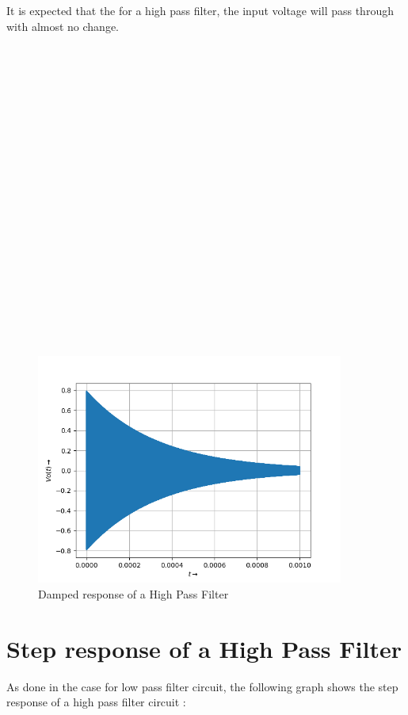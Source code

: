 \documentclass[10pt,a4paper]{article}
\begin{document}
It is expected that the for a high pass filter, the input voltage will pass through with almost no change.\\ \\ \\ \\ \\ \\ \\ \\ \\ \\ \\ \\ \\ \\ \\ \\ \\ \\ \\ \\ \\

\begin{figure}[!tbh]

\includegraphics[width = 0.9\textwidth]{high pass filter Vo(t) for a damped Vi(t).png}
\caption{Damped response of a High Pass Filter}

\end{figure}


\section{Step response of a High Pass Filter}


As done in the case for low pass filter circuit, the following graph shows the step response of a high pass filter circuit : 
\end{document}
